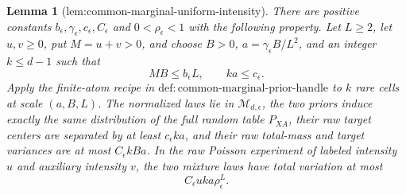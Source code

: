 \documentclass{article}
\newtheorem{lemma}{Lemma}
\begin{document}
\begin{lemma}[lem:common-marginal-uniform-intensity]\label{lem:common-marginal-uniform-intensity}
There are positive constants \(b_\epsilon,\gamma_\epsilon,c_\epsilon,C_\epsilon\) and \(0<\rho_\epsilon<1\) with the following property.  Let \(L\ge2\), let \(u,v\ge0\), put \(M=u+v>0\), and choose \(B>0\), \(a=\gamma_\epsilon B/L^2\), and an integer \(k\le d-1\) such that
\[
 MB\le b_\epsilon L,\qquad ka\le c_\epsilon.                    \tag{C42}
\]
Apply the finite-atom recipe in \(\mathrm{def:common\mbox{-}marginal\mbox{-}prior\mbox{-}handle}\) to \(k\) rare cells at scale \((a,B,L)\).  The normalized laws lie in \(\mathcal M_{d,\epsilon}\), the two priors induce exactly the same distribution of the full random table \(P_{XA}\), their raw target centers are separated by at least \(c_\epsilon ka\), and their raw total-mass and target variances are at most \(C_\epsilon kBa\).  In the raw Poisson experiment of labeled intensity \(u\) and auxiliary intensity \(v\), the two mixture laws have total variation at most
\[
 C_\epsilon uka\rho_\epsilon^L.                                   \tag{C43}
\]
\end{lemma}
\end{document}
